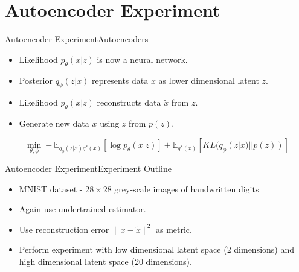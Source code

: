 \documentclass[handout]{beamer}
\begin{document}
\section{Autoencoder Experiment}
\begin{frame}{Autoencoder Experiment}{Autoencoders}
\begin{itemize}
\item Likelihood $p_\theta(x|z)$ is now a neural network.
\item Posterior $q_\phi(z|x)$ represents data $x$ as lower dimensional latent $z$.
\item Likelihood $p_\theta(x|z)$ reconstructs data $\tilde{x}$ from $z$.
\item Generate new data $\tilde{x}$ using $z$ from $p(z)$.
\end{itemize}
\begin{figure}[h]
  \centering
\end{figure}
\[\min_{\theta, \phi} -\mathbb{E}_{q_\phi(z|x)q^*(x)}[\log p_\theta(x|z)]+\mathbb{E}_{q^*(x)}[KL(q_\phi(z|x)||p(z))]\]
\end{frame}
\begin{frame}{Autoencoder Experiment}{Experiment Outline}
\begin{itemize}
\item MNIST dataset - $28\times 28$ grey-scale images of handwritten digits
\vspace{0.5cm}
\item Again use undertrained estimator.
\vspace{0.5cm}
\item Use reconstruction error $\|x-\tilde{x}\|^2$ as metric.
\vspace{0.5cm}
\item Perform experiment with low dimensional latent space (2 dimensions) and high dimensional latent space (20 dimensions).
\end{itemize}
\end{frame}
\end{document}
